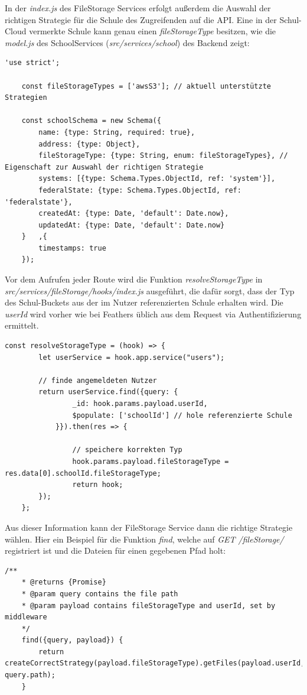 In der \textit{index.js} des FileStorage Services erfolgt außerdem die Auswahl der richtigen Strategie für die Schule des Zugreifenden auf die API. Eine in der Schul-Cloud vermerkte Schule kann genau einen \textit{fileStorageType} besitzen, wie die \textit{model.js} des SchoolServices (\textit{src/services/school}) des Backend zeigt:

\begin{lstlisting}[label= schoolModel]
	'use strict';

	const fileStorageTypes = ['awsS3']; // aktuell unterstützte Strategien
	
	const schoolSchema = new Schema({
		name: {type: String, required: true},
		address: {type: Object},
		fileStorageType: {type: String, enum: fileStorageTypes}, // Eigenschaft zur Auswahl der richtigen Strategie
		systems: [{type: Schema.Types.ObjectId, ref: 'system'}],
		federalState: {type: Schema.Types.ObjectId, ref: 'federalstate'},
		createdAt: {type: Date, 'default': Date.now},
		updatedAt: {type: Date, 'default': Date.now}
	}	,{
		timestamps: true
	});
\end{lstlisting}

Vor dem Aufrufen jeder Route wird die Funktion \textit{resolveStorageType} in \textit{src/services/fileStorage/hooks/index.js} ausgeführt, die dafür sorgt, dass der Typ des Schul-Buckets aus der im Nutzer referenzierten Schule erhalten wird. Die \textit{userId} wird vorher wie bei Feathers üblich aus dem Request via Authentifizierung ermittelt.

\begin{lstlisting}[label= resolveStorageType]
	const resolveStorageType = (hook) => {
		let userService = hook.app.service("users");
		
		// finde angemeldeten Nutzer
		return userService.find({query: {
				_id: hook.params.payload.userId,
				$populate: ['schoolId'] // hole referenzierte Schule
			}}).then(res => {
			
				// speichere korrekten Typ
				hook.params.payload.fileStorageType = res.data[0].schoolId.fileStorageType;
				return hook;
		});
	};
\end{lstlisting}

Aus dieser Information kann der FileStorage Service dann die richtige Strategie wählen. Hier ein Beispiel für die Funktion \textit{find}, welche auf \textit{GET /fileStorage/} registriert ist und die Dateien für einen gegebenen Pfad holt:

\begin{lstlisting}[label=findFiles]
	/**
	* @returns {Promise}
	* @param query contains the file path
	* @param payload contains fileStorageType and userId, set by middleware
	*/
	find({query, payload}) {
		return createCorrectStrategy(payload.fileStorageType).getFiles(payload.userId, query.path);
	}
\end{lstlisting}

